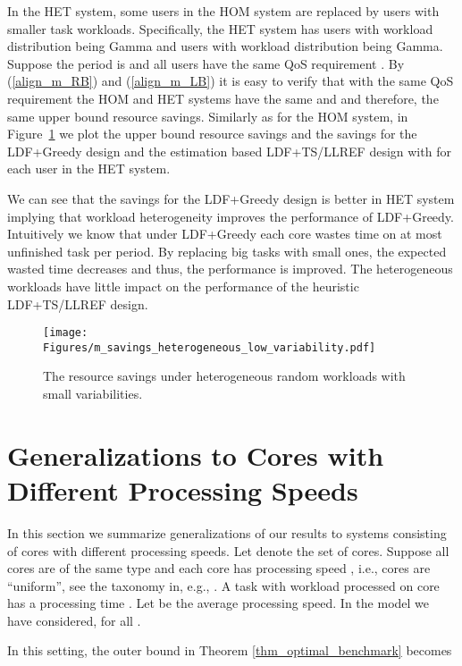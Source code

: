 \documentclass[prodmode,acmtompecs]{acmsmall}
\newcommand{\myComments}[1]{}
\newif\ifinfocom
\newcommand{\infocomStart}{\ifinfocom \myComments{Infocom: }}
\newcommand{\commentEnd}{\myComments{End}}
\begin{document}
In the HET system, some users in the HOM system are replaced by users with smaller task workloads. 
Specifically, the HET system has  users with workload distribution being Gamma and  users with workload distribution being Gamma. Suppose the period is  and all users have the same QoS requirement . By (\ref{align_m_RB}) and (\ref{align_m_LB}) it is easy to verify that with the same QoS requirement  the HOM and HET systems have the same  and  and therefore, the same upper bound resource savings. 
Similarly as for the HOM system, in Figure~{\ref{fig_m_savings_heterogeneous_low_variability}} we plot the upper bound resource savings and the savings for the LDF+Greedy design and the estimation based LDF+TS/LLREF design with  for each user  in the HET system. 

We can see that the savings for the LDF+Greedy design is better in HET system implying that workload heterogeneity improves the performance of LDF+Greedy. Intuitively we know that under LDF+Greedy each core wastes time on at most  unfinished task per period. By replacing big tasks with small ones, the expected wasted time decreases and thus, the performance is improved. 
The heterogeneous workloads have little impact on the performance of the heuristic LDF+TS/LLREF design. 

\begin{figure}[htp]
  \centering
  \texttt{[image: Figures/m\_savings\_heterogeneous\_low\_variability.pdf]}
  \caption{The resource savings under heterogeneous random workloads with small variabilities. }
  \label{fig_m_savings_heterogeneous_low_variability}
\end{figure}
\commentEnd\fi


\infocomStart
\section{Generalizations to Cores with Different Processing Speeds}
\label{section_generalizations}
In this section we summarize generalizations of our results to systems consisting of cores with different processing speeds. 
Let  denote the set of cores. Suppose all cores are of the same type and each core  has processing speed , i.e., cores are ``uniform'', see the taxonomy in, e.g., \cite{DaB11A}. 
A task with workload  processed on core  has a processing time .
Let  be the average processing speed. 
In the model we have considered,  for all . 

In this setting, the outer bound  in Theorem \ref{thm_optimal_benchmark} becomes
\end{document}
